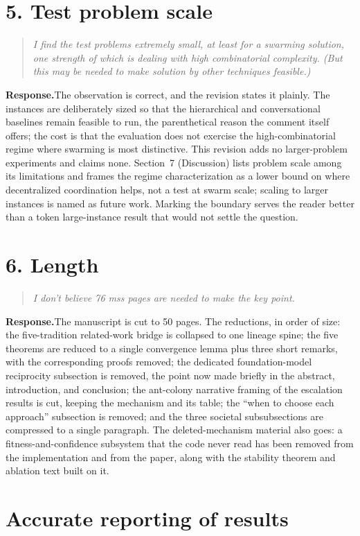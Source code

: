 \documentclass[11pt]{article}
\newcommand{\quoted}[1]{\begin{quote}\itshape #1\end{quote}}
\newcommand{\response}{\par\smallskip\noindent\textbf{Response.}\space}
\begin{document}
\section*{5. Test problem scale}

\quoted{I find the test problems extremely small, at least for a swarming solution, one strength of which is dealing with high combinatorial complexity. (But this may be needed to make solution by other techniques feasible.)}

\response The observation is correct, and the revision states it plainly. The instances are deliberately sized so that the hierarchical and conversational baselines remain feasible to run, the parenthetical reason the comment itself offers; the cost is that the evaluation does not exercise the high-combinatorial regime where swarming is most distinctive. This revision adds no larger-problem experiments and claims none. Section~7 (Discussion) lists problem scale among its limitations and frames the regime characterization as a lower bound on where decentralized coordination helps, not a test at swarm scale; scaling to larger instances is named as future work. Marking the boundary serves the reader better than a token large-instance result that would not settle the question.

\section*{6. Length}

\quoted{I don't believe 76 mss pages are needed to make the key point.}

\response The manuscript is cut to 50 pages. The reductions, in order of size: the five-tradition related-work bridge is collapsed to one lineage spine; the five theorems are reduced to a single convergence lemma plus three short remarks, with the corresponding proofs removed; the dedicated foundation-model reciprocity subsection is removed, the point now made briefly in the abstract, introduction, and conclusion; the ant-colony narrative framing of the escalation results is cut, keeping the mechanism and its table; the ``when to choose each approach'' subsection is removed; and the three societal subsubsections are compressed to a single paragraph. The deleted-mechanism material also goes: a fitness-and-confidence subsystem that the code never read has been removed from the implementation and from the paper, along with the stability theorem and ablation text built on it.

\section*{Accurate reporting of results}
\end{document}

